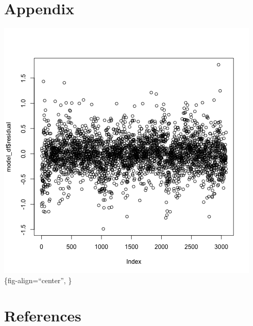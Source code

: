 \documentclass[
]{article}
\begin{document}
\newpage{}

\section{Appendix}\label{appendix}

\includegraphics{residual_plot.png}\{fig-align=``center'', \}

\newpage{}

\section{References}\label{references}
\end{document}
